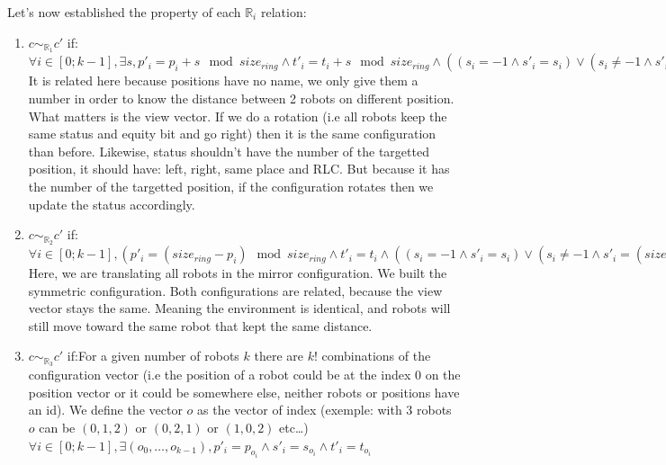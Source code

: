 \documentclass{article}
\begin{document}
Let's now established the property of each $\mathbb{R}_{i}$ relation:
\begin{enumerate}
    \item $c \sim_{\mathbb{R}_{1}} c'$ if:\newline $\forall i \in [0;k-1], \exists s , p'_{i} = p_{i} + s \mod{size_{ring}} \land t'_{i} = t_{i} + s \mod{size_{ring}} \land  ( (s_{i} = -1 \land s'_{i} = s_{i}) \lor  (s_{i} \not= -1 \land s'_{i} = s_{i} + s \mod{size_{ring}}))$\newline It is related here because positions have no name, we only give them a number in order to know the distance between 2 robots on different position. What matters is the view vector. If we do a rotation  (i.e all robots keep the same status and equity bit and go right) then it is the same configuration than before. Likewise, status shouldn't have the number of the targetted position, it should have: left, right, same place and RLC. But because it has the number of the targetted position, if the configuration rotates then we update the status accordingly.
    
    \item $c \sim_{\mathbb{R}_{2}} c'$ if:\newline $\forall i \in [0; k-1],  (p'_{i} =  (size_{ring} - p_{i})\mod{size_{ring}} \land t'_{i} = t_{i} \land  ( (s_{i} = -1 \land s'_{i} = s_{i}) \lor  (s_{i} \not= -1 \land s'_{i} =  (size_{ring} - s_{i})\mod{size_{ring}})) \bigvee  (p'_{i} = p_{i} \land s'_{i} = s_{i} \land t'_{i} = t_{i}))$\newline Here, we are translating all robots in the mirror configuration. We built the symmetric configuration. Both configurations are related, because the view vector stays the same. Meaning the environment is identical, and robots will still move toward the same robot that kept the same distance.
    
    \item $c \sim_{\mathbb{R}_{3}} c'$ if:\newline For a given number of robots $k$ there are $k!$ combinations of the configuration vector  (i.e the position of a robot could be at the index 0 on the position vector or it could be somewhere else, neither robots or positions have an id). We define the vector $o$ as the vector of index  (exemple: with 3 robots $o$ can be $ (0, 1, 2)$ or $ (0, 2, 1)$ or $ (1, 0, 2)$ etc\ldots)\newline $\forall i \in [0;k-1], \exists  (o_{0},\dots, o_{k-1}), p'_{i} = p_{o_{i}} \land s'_{i} = s_{o_{i}} \land t'_{i} = t_{o_{i}} $
\end{enumerate}
\end{document}
